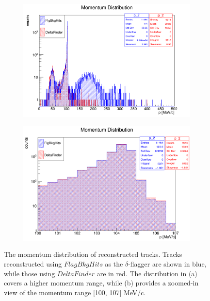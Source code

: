\begin{figure}[!h]
    \begin{subfigure}[b]{0.5\textwidth}
        \centering
        \includegraphics[width = 1.1\textwidth]{figures/png/Screenshot_20240820_162125.png}
        \subcaption{}
        \label{fig:highlevel1}
    \end{subfigure}
    \begin{subfigure}[b]{0.5\textwidth}
        \centering
        \includegraphics[width = 1.1\textwidth]{figures/png/Screenshot_20240820_160904.png}
        \subcaption{}
        \label{fig:highlevel2}
    \end{subfigure}
    \caption[Momentum distribution of reconstructed tracks.]{The momentum distribution of reconstructed tracks. 
    Tracks reconstructed using $FlagBkgHits$ as the $\delta$-flagger are shown in blue, while those 
    using $DeltaFinder$ are in red. The distribution in (a) covers a higher momentum range, while (b) 
    provides a zoomed-in view of the momentum range [100, 107] MeV/c.
    }
    \label{fig:highlevel} 
\end{figure}

